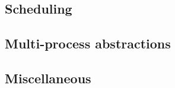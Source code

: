 \subsection{Scheduling}
















\subsection{Multi-process abstractions}













\subsection{Miscellaneous}

